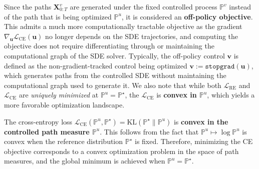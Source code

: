 \documentclass{article}
\newcommand{\boldtext}[1]{\textbf{\textcolor{MyGreen}{#1}}}
\begin{document}
Since the paths $\boldsymbol{X}_{0:T}^v$ are generated under the fixed controlled process $\mathbb{P}^v$ instead of the path that is being optimized $\mathbb{P}^u$, it is considered an \boldtext{off-policy objective}. This admits a much more computationally tractable objective as the gradient $\nabla_{\boldsymbol{u}}\mathcal{L}_{\text{CE}}(\boldsymbol{u})$ no longer depends on the SDE trajectories, and computing the objective does not require differentiating through or maintaining the computational graph of the SDE solver. Typically, the off-policy control $\boldsymbol{v}$ is defined as the non-gradient-tracked control being optimized $\boldsymbol{v}:=\texttt{stopgrad}(\boldsymbol{u})$, which generates paths from the controlled SDE without maintaining the computational graph used to generate it. We also note that while both $\mathcal{L}_{\text{RE}}$ and $\mathcal{L}_{\text{CE}}$ are \textit{uniquely minimized} at $\mathbb{P}^u = \mathbb{P}^\star$, the $\mathcal{L}_{\text{CE}}$ is \textbf{convex in $\mathbb{P}^u$}, which yields a more favorable optimization landscape. 

\begin{remark}\label{remark:ce-convex}
The cross-entropy loss $\mathcal{L}_{\mathrm{CE}}(\mathbb{P}^u,\mathbb{P}^\star) = \mathrm{KL}(\mathbb{P}^\star \| \mathbb{P}^u)$ is \textbf{convex in the controlled path measure $\mathbb{P}^u$}. This follows from the fact that $\mathbb{P}^u\mapsto  \log \mathbb{P}^u$ is convex when the reference distribution $\mathbb{P}^\star$ is fixed. Therefore, minimizing the CE objective corresponds to a convex optimization problem in the space of path measures, and the global minimum is achieved when $\mathbb{P}^u = \mathbb{P}^\star$. 
\end{remark}
\end{document}
